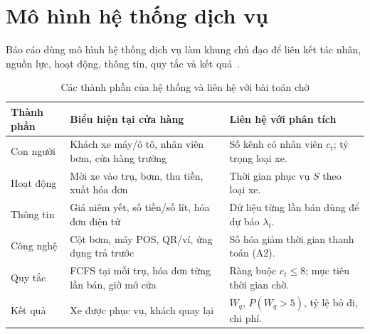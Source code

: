 \section{Mô hình hệ thống dịch vụ}
\label{r1:system}
Báo cáo dùng mô hình hệ thống dịch vụ làm khung chủ đạo để liên kết tác nhân,
nguồn lực, hoạt động, thông tin, quy tắc và kết quả~\cite{rubric}.
\begin{table}[htbp]\centering\small
\caption{Các thành phần của hệ thống và liên hệ với bài toán chờ}\label{r1:components}
\begin{tabularx}{\linewidth}{@{}p{24mm}Y Y@{}}
\toprule
Thành phần & Biểu hiện tại cửa hàng & Liên hệ với phân tích \\
\midrule
Con người & Khách xe máy/ô tô, nhân viên bơm, cửa hàng trưởng & Số kênh có nhân viên $c_t$; tỷ trọng loại xe. \\
Hoạt động & Mời xe vào trụ, bơm, thu tiền, xuất hóa đơn & Thời gian phục vụ $S$ theo loại xe. \\
Thông tin & Giá niêm yết, số tiền/số lít, hóa đơn điện tử & Dữ liệu từng lần bán dùng để dự báo $\lambda_t$. \\
Công nghệ & Cột bơm, máy POS, QR/ví, ứng dụng trả trước & Số hóa giảm thời gian thanh toán (A2). \\
Quy tắc & FCFS tại mỗi trụ, hóa đơn từng lần bán, giờ mở cửa & Ràng buộc $c_t\le8$; mục tiêu thời gian chờ. \\
Kết quả & Xe được phục vụ, khách quay lại & $W_q$, $P(W_q{>}5)$, tỷ lệ bỏ đi, chi phí. \\
\bottomrule
\end{tabularx}
\end{table}

